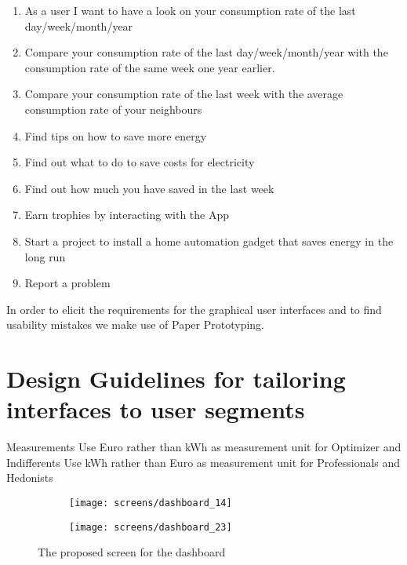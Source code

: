 \begin{enumerate}
	\item As a user I want to have a look on your consumption rate of the last day/week/month/year
	\item Compare your consumption rate of the last day/week/month/year with the consumption rate of the same week one year earlier.
	\item Compare your consumption rate of the last week with the average consumption rate of your neighbours
	\item Find tips on how to save more energy
	\item Find out what to do to save costs for electricity
	\item Find out how much you have saved in the last week
	\item Earn trophies by interacting with the App
	\item Start a project to install a home automation gadget that saves energy in the long run
	\item Report a problem
\end{enumerate}



In order to elicit the requirements for the graphical user interfaces and to find usability mistakes we make use of Paper Prototyping. 



\section{Design Guidelines for tailoring interfaces to user segments}

Measurements
Use Euro rather than kWh as measurement unit for Optimizer and Indifferents
Use kWh rather than Euro as measurement unit for Professionals and Hedonists
\begin{figure}[h]
	\centering
	\begin{subfigure}[b]{0.24\columnwidth}
		\centering
		\texttt{[image: screens/dashboard\_14]}
		\label{fig:dasboard:professional}
	\end{subfigure}
	\begin{subfigure}[b]{0.24\columnwidth}
		\centering
		\texttt{[image: screens/dashboard\_23]}
		\label{fig:dashboard:optimizer}
	\end{subfigure}
	\caption{The proposed screen for the dashboard}
	\label{fig:dashboard} %
\end{figure}



